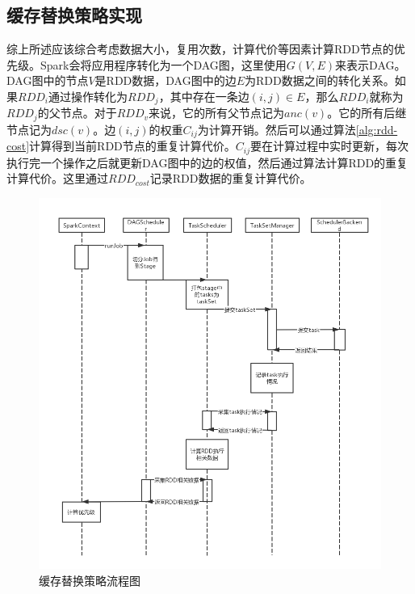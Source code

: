 \subsection{缓存替换策略实现}

综上所述应该综合考虑数据大小，复用次数，计算代价等因素计算RDD节点的优先级。Spark会将应用程序转化为一个DAG图，这里使用$G(V, E)$来表示DAG。DAG图中的节点$V$是RDD数据，DAG图中的边$E$为RDD数据之间的转化关系。如果$RDD_i$通过操作转化为$RDD_j$，其中存在一条边$(i, j)\in E$，那么$RDD_i$就称为$RDD_j$的父节点。对于$RDD_v$来说，它的所有父节点记为$anc(v)$。它的所有后继节点记为$dsc(v)$。边$(i,j)$的权重$C_{ij}$为计算开销。然后可以通过算法\ref{alg:rdd-cost}计算得到当前RDD节点的重复计算代价。$C_{ij}$要在计算过程中实时更新，每次执行完一个操作之后就更新DAG图中的边的权值，然后通过算法计算RDD的重复计算代价。这里通过$RDD_{cost}$记录RDD数据的重复计算代价。

\begin{figure}[htbp]
    \centering
    \includegraphics[width=1\textwidth]{Img/替换策略流程图.png}
    \caption{缓存替换策略流程图}
    \label{fig:spark-dag}
\end{figure}

